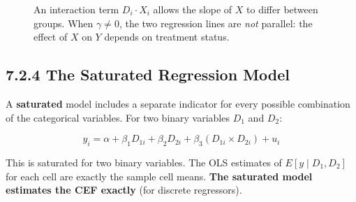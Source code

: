 \begin{figure}[htbp]
  \centering
  \caption{An interaction term $D_i \cdot X_i$ allows the slope of $X$ to differ between groups. When $\gamma \neq 0$, the two regression lines are \emph{not} parallel: the effect of $X$ on $Y$ depends on treatment status.}
  \label{fig:ch07_interaction}
\end{figure}

\subsection{7.2.4 The Saturated Regression Model}

A \textbf{saturated} model includes a separate indicator for every possible combination of the categorical variables. For two binary variables $D_1$ and $D_2$:

\[
y_i = \alpha + \beta_1 D_{1i} + \beta_2 D_{2i} + \beta_3 (D_{1i} \times D_{2i}) + u_i
\]

This is saturated for two binary variables. The OLS estimates of $E[y \mid D_1, D_2]$ for each cell are exactly the sample cell means. \textbf{The saturated model estimates the CEF exactly} (for discrete regressors).

